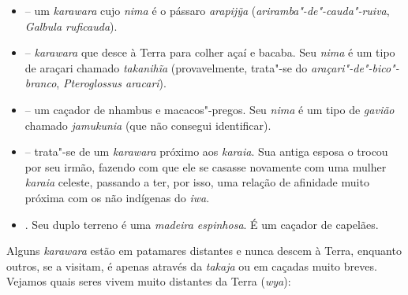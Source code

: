 \begin{itemize}
{  americana}).
\item
   -- um \emph{karawara} cujo
  \emph{nima} é o pássaro \emph{arapijỹa}
  (\emph{ariramba"-de"-cauda"-ruiva}, \emph{Galbula ruficauda}).
\item
   -- \emph{karawara} que desce à Terra para
  colher açaí e bacaba. Seu \emph{nima} é um tipo de araçari chamado
  \emph{takanihĩa} (provavelmente, trata"-se do
  \emph{araçari"-de"-bico"-branco}, \emph{Pteroglossus aracari}).
\item
   -- um caçador de nhambus e
  macacos"-pregos. Seu \emph{nima} é um tipo de \emph{gavião} chamado
  \emph{jamukunia} (que não consegui identificar).
\item
  \emph{} -- trata"-se de um \emph{karawara} próximo aos
  \emph{karaia}. Sua antiga esposa o trocou por seu irmão, fazendo com
  que ele se casasse novamente com uma mulher \emph{karaia} celeste,
  passando a ter, por isso, uma relação de afinidade muito próxima com
  os não indígenas do \emph{iwa}.
\item
  \emph{}. Seu duplo terreno é uma \emph{madeira espinhosa}. É
  um caçador de capelães.
\end{itemize}

Alguns \emph{karawara} estão em patamares distantes e nunca descem à
Terra, enquanto outros, se a visitam, é apenas através da \emph{takaja}
ou em caçadas muito breves. Vejamos quais seres vivem muito distantes da
Terra (\emph{wya}):

